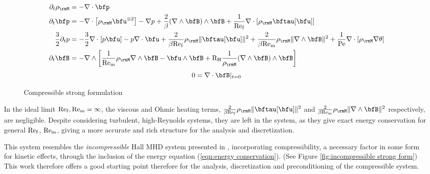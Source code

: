    \begin{figure}
        \centering
        \line
        \begin{align}
            \partial_{t}\rho_{\rmM}  &=  - \nabla\cdot\bfp  \\
            \partial_{t}\bfp  &=  -  \nabla\cdot\left[\rho_{\rmM}\bfu^{\otimes 2}\right] - \nabla p + \frac{2}{\beta}(\nabla\wedge\bfB)\wedge\bfB + \frac{1}{\rmRef}\nabla\cdot[\rho_{\rmM}\bftau[\bfu]]  \\
            \frac{3}{2}\partial_{t}p  &=  - \frac{3}{2}\nabla\cdot[p\bfu] - p\nabla\cdot\bfu + \frac{2}{\beta\rmRef}\rho_{\rmM}\|\bftau[\bfu]\|^{2} + \frac{2}{\beta\rmRem}\rho_{\rmM}\|\nabla\wedge\bfB\|^{2} + \frac{1}{\rmPe}\nabla\cdot[\rho_{\rmM}\nabla\theta]  \label{eqn:energy conservation}  \\
            \partial_{t}\bfB  &=  - \nabla\wedge\left[\frac{1}{\rmRem}\rho_{\rmM}\nabla\wedge\bfB - \bfu\wedge\bfB + \rmRH\frac{1}{\rho_{\rmM}}(\nabla\wedge\bfB)\wedge\bfB\right]
        \end{align}
        \shortline
        \begin{equation}
            0  =  \nabla\cdot\bfB|_{t = 0}
        \end{equation}
        \line
        \caption{Compressible strong formulation}
        \label{fig:compressible strong form}
    \end{figure}

    In the ideal limit $\mathrm{Re}_{\mathrm{f}}, \mathrm{Re}_{\mathrm{m}}  =  \infty$, the viscous and Ohmic heating terms, $\frac{2}{\beta\rmRef}\rho_{\rmM}\|\bftau[\bfu]\|^{2}$ and $\frac{2}{\beta\rmRem}\rho_{\rmM}\|\nabla\wedge\bfB\|^{2}$ respectively, are negligible. Despite considering turbulent, high-Reynolds systems, they are left in the system, as they give exact energy conservation for general $\mathrm{Re}_{\mathrm{f}}$, $\mathrm{Re}_{\mathrm{m}}$, giving a more accurate and rich structure for the analysis and discretization.

    This system resembles the \emph{incompressible} Hall MHD system presented in \cite{Laakmann_Hu_Farrell_2022}, incorporating compressibility, a necessary factor in some form for kinetic effects, through the inclusion of the energy equation (\ref{eqn:energy conservation}). (See Figure \ref{fig:incompressible strong form}) This work therefore offers a good starting point therefore for the analysis, discretization and preconditioning of the compressible system.

